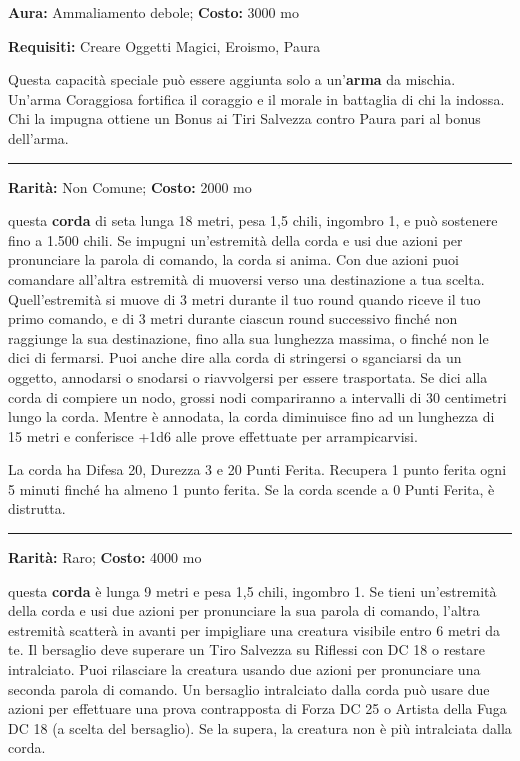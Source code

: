 \begin{multicols}{2}
\textbf{Aura:} Ammaliamento debole; \textbf{Costo:} 3000 mo

\textbf{Requisiti:} Creare Oggetti Magici, Eroismo, Paura

Questa capacità speciale può essere aggiunta solo a un'\textbf{arma} da mischia. Un'arma Coraggiosa fortifica il coraggio e il morale in battaglia di chi la indossa. Chi la impugna ottiene un Bonus ai Tiri Salvezza contro Paura pari al bonus dell'arma.

\smallskip\noindent\rule{\linewidth}{2pt}  \hypertarget{CordadaArrampicata}{}\smallskip{}\noindent\label{CordadaArrampicata}

\textbf{Rarità:} Non Comune; \textbf{Costo:} 2000 mo

questa \textbf{corda} di seta lunga 18 metri, pesa 1,5 chili, ingombro 1, e può sostenere fino a 1.500 chili. Se impugni un'estremità della corda e usi due azioni per pronunciare la parola di comando, la corda si anima. Con due azioni puoi comandare all'altra estremità di muoversi verso una destinazione a tua scelta. Quell'estremità si muove di 3 metri durante il tuo round quando riceve il tuo primo comando, e di 3 metri durante ciascun round successivo finché non raggiunge la sua destinazione, fino alla sua lunghezza massima, o finché non le dici di fermarsi. Puoi anche dire alla corda di stringersi o sganciarsi da un oggetto, annodarsi o snodarsi o riavvolgersi per essere trasportata. Se dici alla corda di compiere un nodo, grossi nodi compariranno a intervalli di 30 centimetri lungo la corda. Mentre è annodata, la corda diminuisce fino ad un lunghezza di 15 metri e conferisce +1d6 alle prove effettuate per arrampicarvisi.

La corda ha Difesa 20, Durezza 3 e 20 Punti Ferita. Recupera 1 punto ferita ogni 5 minuti finché ha almeno 1 punto ferita. Se la corda scende a 0 Punti Ferita, è distrutta.

\smallskip\noindent\rule{\linewidth}{2pt}  \hypertarget{Cordadell'Intralciamento}{}\smallskip{}\noindent\label{Cordadell'Intralciamento}

\textbf{Rarità:} Raro; \textbf{Costo:} 4000 mo

questa \textbf{corda} è lunga 9 metri e pesa 1,5 chili, ingombro 1. Se tieni un'estremità della corda e usi due azioni per pronunciare la sua parola di comando, l'altra estremità scatterà in avanti per impigliare una creatura visibile entro 6 metri da te. Il bersaglio deve superare un Tiro Salvezza su Riflessi con DC 18 o restare intralciato. Puoi rilasciare la creatura usando due azioni per pronunciare una seconda parola di comando. Un bersaglio intralciato dalla corda può usare due azioni per effettuare una prova contrapposta di Forza DC 25 o Artista della Fuga DC 18 (a scelta del bersaglio). Se la supera, la creatura non è più intralciata dalla corda.


\end{multicols}
